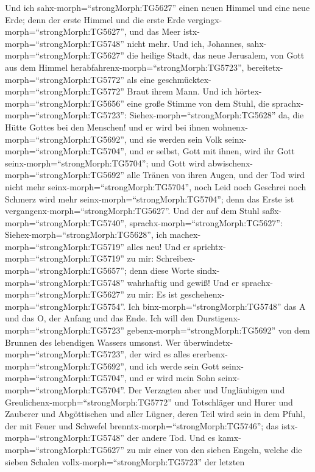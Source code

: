  Und ich sahx-morph=``strongMorph:TG5627'' einen neuen
Himmel und eine neue Erde; denn der erste Himmel und die erste Erde
vergingx-morph=``strongMorph:TG5627'', und das Meer
istx-morph=``strongMorph:TG5748'' nicht mehr.  Und ich,
Johannes, sahx-morph=``strongMorph:TG5627'' die heilige Stadt, das neue
Jerusalem, von Gott aus dem Himmel
herabfahrenx-morph=``strongMorph:TG5723'',
bereitetx-morph=``strongMorph:TG5772'' als eine
geschmücktex-morph=``strongMorph:TG5772'' Braut ihrem Mann. 
Und ich hörtex-morph=``strongMorph:TG5656'' eine große Stimme von dem
Stuhl, die sprachx-morph=``strongMorph:TG5723'':
Siehex-morph=``strongMorph:TG5628'' da, die Hütte Gottes bei den
Menschen! und er wird bei ihnen wohnenx-morph=``strongMorph:TG5692'',
und sie werden sein Volk seinx-morph=``strongMorph:TG5704'', und er
selbst, Gott mit ihnen, wird ihr Gott
seinx-morph=``strongMorph:TG5704'';  und Gott wird
abwischenx-morph=``strongMorph:TG5692'' alle Tränen von ihren Augen, und
der Tod wird nicht mehr seinx-morph=``strongMorph:TG5704'', noch Leid
noch Geschrei noch Schmerz wird mehr seinx-morph=``strongMorph:TG5704'';
denn das Erste ist vergangenx-morph=``strongMorph:TG5627''. 
Und der auf dem Stuhl saßx-morph=``strongMorph:TG5740'',
sprachx-morph=``strongMorph:TG5627'':
Siehex-morph=``strongMorph:TG5628'', ich
machex-morph=``strongMorph:TG5719'' alles neu! Und er
sprichtx-morph=``strongMorph:TG5719'' zu mir:
Schreibex-morph=``strongMorph:TG5657''; denn diese Worte
sindx-morph=``strongMorph:TG5748'' wahrhaftig und gewiß! 
Und er sprachx-morph=``strongMorph:TG5627'' zu mir: Es ist
geschehenx-morph=``strongMorph:TG5754''. Ich
binx-morph=``strongMorph:TG5748'' das A und das O, der Anfang und das
Ende. Ich will den Durstigenx-morph=``strongMorph:TG5723''
gebenx-morph=``strongMorph:TG5692'' von dem Brunnen des lebendigen
Wassers umsonst.  Wer
überwindetx-morph=``strongMorph:TG5723'', der wird es alles
ererbenx-morph=``strongMorph:TG5692'', und ich werde sein Gott
seinx-morph=``strongMorph:TG5704'', und er wird mein Sohn
seinx-morph=``strongMorph:TG5704''.  Der Verzagten aber und
Ungläubigen und Greulichenx-morph=``strongMorph:TG5772'' und Totschläger
und Hurer und Zauberer und Abgöttischen und aller Lügner, deren Teil
wird sein in dem Pfuhl, der mit Feuer und Schwefel
brenntx-morph=``strongMorph:TG5746''; das
istx-morph=``strongMorph:TG5748'' der andere Tod.  Und es
kamx-morph=``strongMorph:TG5627'' zu mir einer von den sieben Engeln,
welche die sieben Schalen vollx-morph=``strongMorph:TG5723'' der letzten
